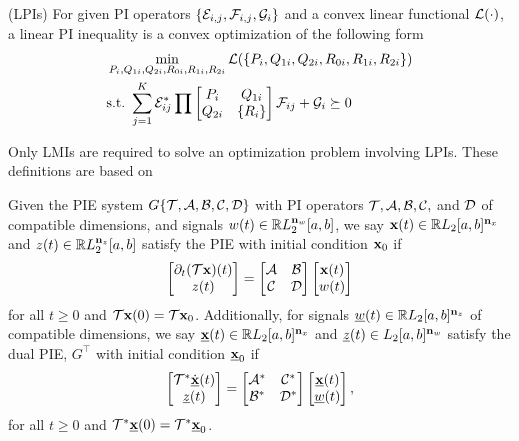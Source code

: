 \begin{definition}(LPIs)
	\label{def_LPI}
	For given PI operators $\{\mathcal{E}_{i,j}, \mathcal{F}_{i,j}, \mathcal{G}_i\}$ and a convex linear functional $\mathcal{L}(\cdot)$, a linear PI inequality is a convex optimization of the following form
	\begin{align}
		 & \min\limits_{P_i, Q_{1i}, Q_{2i}, R_{0i}, R_{1i}, R_{2i}}  \mathcal{L}(\{P_i, Q_{1i}, Q_{2i}, R_{0i}, R_{1i}, R_{2i}\})\notag \\
		 & \mathrm{s. t. }\ \sum\limits_{j = 1}^K \mathcal{E}_{ij}^*\prod \begin{bmatrix}
			                                                             P_i    & Q_{1i}  \\
			                                                             Q_{2i} & \{R_i\} \\
		                                                             \end{bmatrix}\mathcal{F}_{ij} +\mathcal{G}_i \succeq 0
	\end{align}
\end{definition}
Only LMIs are required to solve an optimization problem involving LPIs.
These definitions are based on \cite{shivaknew}
\begin{definition}\label{def:PIE}
	Given the PIE system $G\{\mathcal{T}, \mathcal{A}, \mathcal{B}, \mathcal{C}, \mathcal{D}\}$
	with PI operators $\mathcal{T}, \mathcal{A}, \mathcal{B}, \mathcal{C},$ and $\mathcal{D}$ of compatible dimensions,
	and signals $w(t)\in \mathbb{R} L_2^{\mathbf{n}_w}[a,b]$, we say $\mathbf{x}(t)\in\mathbb{R} L_2[a,b]^{\mathbf{n}_x}$ and $z(t)\in \mathbb{R} L_2^{\mathbf{n}_z}[a,b]$ 
	satisfy the PIE with initial condition $\mathbf{x}_0$ if
	\begin{equation}
		\begin{bmatrix}\partial_t(\mathcal{T}\mathbf{x})(t)\\ z(t)\end{bmatrix} = \begin{bmatrix}\mathcal{A} & \mathcal{B} \\
			\mathcal{C} & \mathcal{D}\end{bmatrix}\begin{bmatrix}\mathbf{x}(t) \\ w(t)\end{bmatrix}
	\end{equation}
	for all $t\geq0$ and $\mathcal{T}\mathbf{x}(0) = \mathcal{T}\mathbf{x}_0$. Additionally, for signals $\underline{w}(t)\in\mathbb{R} L_2[a,b]^{\mathbf{n}_z}$
	of compatible dimensions, we say $\underline{\mathbf{x}}(t)\in\mathbb{R} L_2[a,b]^{\mathbf{n}_x}$ and $\underline{z}(t)\in L_2[a,b]^{\mathbf{n}_w}$
	satisfy the dual PIE, $G^\top$ with initial condition $\underline{\mathbf{x}}_0$ if
    \begin{equation}
        \begin{bmatrix}\mathcal{T}^*\underline{\dot{\mathbf{x}}}(t)\\ \underline{z}(t)\end{bmatrix}
        =
        \begin{bmatrix}\mathcal{A}^* & \mathcal{C}^*\\
              \mathcal{B}^* & \mathcal{D}^*\end{bmatrix}
        \begin{bmatrix}\underline{\mathbf{x}}(t)\\ \underline{w}(t)\end{bmatrix},
    \end{equation}
	for all $t\geq0$ and $\mathcal{T}^*\underline{\mathbf{x}}(0) = \mathcal{T}^*\underline{\mathbf{x}}_0$.
\end{definition}

